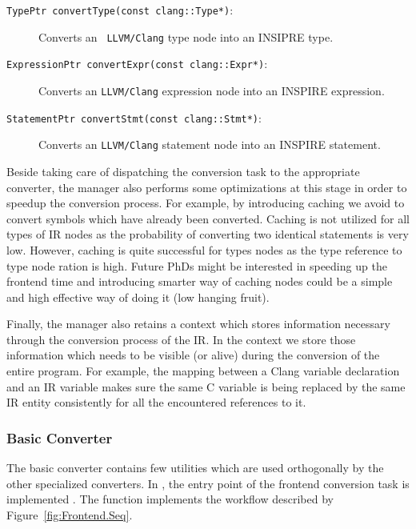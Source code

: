 \begin{description}
\item [{\tt TypePtr convertType(const clang::Type*)}:] Converts an {\tt
LLVM/Clang} type node into an INSIPRE type.

\item [{\tt ExpressionPtr convertExpr(const clang::Expr*)}:] Converts an
{\tt LLVM/Clang} expression node into an INSPIRE expression. 

\item [{\tt StatementPtr convertStmt(const clang::Stmt*)}:] Converts an
{\tt LLVM/Clang} statement node into an INSPIRE statement.

\end{description}

Beside taking care of dispatching the conversion task to the appropriate
converter, the manager also performs some optimizations at this stage in order
to speedup the conversion process. For example, by introducing caching we avoid
to convert symbols which have already been converted. Caching is not utilized
for all types of IR nodes as the probability of converting two identical
statements is very low. However, caching is quite successful for types nodes as
the type reference to type node ration is high. Future PhDs might be interested
in speeding up the frontend time and introducing smarter way of caching nodes
could be a simple and high effective way of doing it (low hanging fruit).

Finally, the manager also retains a context which stores information necessary
through the conversion process of the IR. In the context we store those
information which needs to be visible (or alive) during the conversion of the
entire program. For example, the mapping between a Clang variable declaration
and an IR variable makes sure the same C variable is being replaced by the same IR
entity consistently for all the encountered references to it. 

\subsubsection{Basic Converter}

The basic converter contains few utilities which are used orthogonally by the
other specialized converters. In , the
entry point of the frontend conversion task is implemented
. The function implements the workflow described by
Figure~\ref{fig:Frontend.Seq}.

